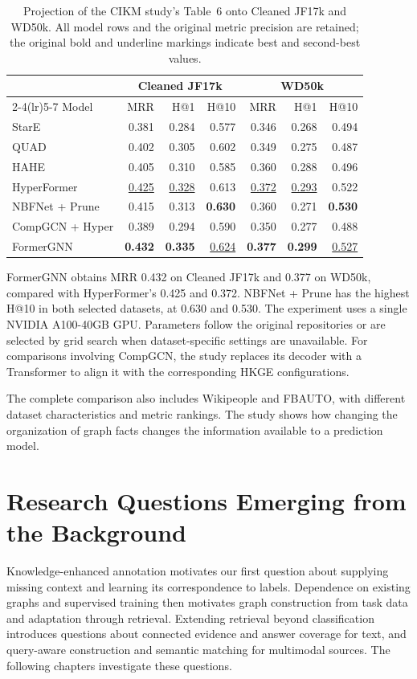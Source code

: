 \begin{table}[tbp]
\centering
\caption{Projection of the CIKM study's Table~6 onto Cleaned JF17k and WD50k. All model rows and the original metric precision are retained; the original bold and underline markings indicate best and second-best values.}
\label{tab:background:formergnn}
\small
\begin{tabular}{lrrrrrr}
\toprule
&\multicolumn{3}{c}{Cleaned JF17k}&\multicolumn{3}{c}{WD50k}\\
\cmidrule(lr){2-4}\cmidrule(lr){5-7}
Model&MRR&H@1&H@10&MRR&H@1&H@10\\
\midrule
StarE&0.381&0.284&0.577&0.346&0.268&0.494\\
QUAD&0.402&0.305&0.602&0.349&0.275&0.487\\
HAHE&0.405&0.310&0.585&0.360&0.288&0.496\\
HyperFormer&\underline{0.425}&\underline{0.328}&0.613&\underline{0.372}&\underline{0.293}&0.522\\
NBFNet + Prune&0.415&0.313&\textbf{0.630}&0.360&0.271&\textbf{0.530}\\
CompGCN + Hyper&0.389&0.294&0.590&0.350&0.277&0.488\\
FormerGNN&\textbf{0.432}&\textbf{0.335}&\underline{0.624}&\textbf{0.377}&\textbf{0.299}&\underline{0.527}\\
\bottomrule
\end{tabular}
\end{table}

FormerGNN obtains MRR 0.432 on Cleaned JF17k and 0.377 on WD50k, compared with HyperFormer's 0.425 and 0.372. NBFNet + Prune has the highest H@10 in both selected datasets, at 0.630 and 0.530. The experiment uses a single NVIDIA A100-40GB GPU. Parameters follow the original repositories or are selected by grid search when dataset-specific settings are unavailable. For comparisons involving CompGCN, the study replaces its decoder with a Transformer to align it with the corresponding HKGE configurations.

The complete comparison also includes Wikipeople and FBAUTO, with different dataset characteristics and metric rankings. The study shows how changing the organization of graph facts changes the information available to a prediction model.

\section{Research Questions Emerging from the Background}
\label{sec:background:questions}

Knowledge-enhanced annotation motivates our first question about supplying missing context and learning its correspondence to labels. Dependence on existing graphs and supervised training then motivates graph construction from task data and adaptation through retrieval. Extending retrieval beyond classification introduces questions about connected evidence and answer coverage for text, and query-aware construction and semantic matching for multimodal sources. The following chapters investigate these questions.
